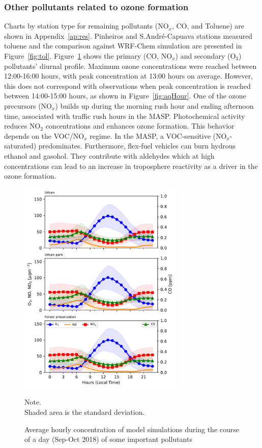 \subsubsection{Other pollutants related to ozone formation} 
Charts by station type for remaining pollutants (NO$_x$, CO, and Toluene) are shown in Appendix~\ref{ap:res}.
Pinheiros and S.Andr\'{e}-Capuava stations measured toluene and the comparison against WRF-Chem simulation are presented in Figure~\ref{fig:tol}.
Figure~\ref{fig: Variation_pol_day} shows the primary (CO, NO$_x$) and secondary (O$_3$) pollutants' diurnal profile.
Maximum ozone concentrations were reached between 12:00-16:00 hours, with peak concentration at 13:00 hours on average.
However, this does not correspond with observations when peak concentration is reached between 14:00-15:00 hours, as shown in Figure~\ref{fig:aqHour}.
One of the ozone precursors (NO$_x$) builds up during the morning rush hour and ending afternoon time, associated with traffic rush hours in the MASP.
Photochemical activity reduces NO$_2$ concentrations and enhances ozone formation.
This behavior depends on the VOC/NO$_x$ regime.
In the MASP, a VOC-sensitive (NO$_x$-saturated) predominates.
Furthermore, flex-fuel vehicles can burn hydrous ethanol and gasohol.
They contribute with aldehydes \citep{Nogueira2014} which at high concentrations can lead to an increase in troposphere reactivity as a driver in the ozone formation.

\begin{figure}[!hbt]
	\begin{center}
		\includegraphics[width=0.7\textwidth]{fig/Variation_pol_day}
	\end{center}
  \caption{Average hourly concentration of model simulations during the course of a day (Sep-Oct 2018) of some important pollutants}
  {\scriptsize Note.\\ Shaded area is the standard deviation.}
  \label{fig: Variation_pol_day}
\end{figure}

